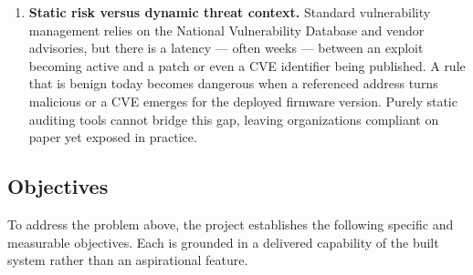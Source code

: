 \documentclass[12pt,a4paper]{report}
\renewcommand{\_}{\textunderscore\allowbreak}
\begin{document}
\begin{enumerate}[leftmargin=1.6em, label=\textbf{P\arabic*.}]
  \item \textbf{Static risk versus dynamic threat context.} Standard vulnerability management relies on the National Vulnerability Database and vendor advisories, but there is a latency --- often weeks --- between an exploit becoming active and a patch or even a CVE identifier being published. A rule that is benign today becomes dangerous when a referenced address turns malicious or a CVE emerges for the deployed firmware version. Purely static auditing tools cannot bridge this gap, leaving organizations compliant on paper yet exposed in practice.
\end{enumerate}

\subsection{Objectives}
\label{sec:ch1-objectives}

To address the problem above, the project establishes the following specific and measurable objectives. Each is grounded in a delivered capability of the built system rather than an aspirational feature.
\end{document}
